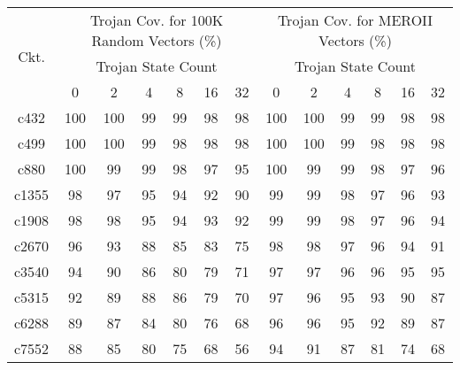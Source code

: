 




\begin{table}[h]
\begin{tabular}{|c|c|c|c|c|c|c|c|c|c|c|c|c|}
\hline
\multirow{3}{*}{Ckt.} & \multicolumn{6}{c|}{Trojan Cov. for 100K Random Vectors (\%)} & \multicolumn{6}{c|}{Trojan Cov. for MEROII Vectors (\%)} \\ \cline{2-13} 
                      & \multicolumn{6}{c|}{Trojan State Count}                       & \multicolumn{6}{c|}{Trojan State Count}                  \\ \cline{2-13} 
                      & 0         & 2         & 4       & 8       & 16      & 32      & 0        & 2        & 4       & 8      & 16     & 32     \\ \hline
c432                  & 100       & 100       & 99      & 99      & 98      & 98      & 100      & 100      & 99      & 99     & 98     & 98     \\ \hline
c499                  & 100       & 100       & 99      & 98      & 98      & 98      & 100      & 100      & 99      & 98     & 98     & 98     \\ \hline
c880                  & 100       & 99        & 99      & 98      & 97      & 95      & 100      & 99       & 99      & 98     & 97     & 96     \\ \hline
c1355                 & 98        & 97        & 95      & 94      & 92      & 90      & 99       & 99       & 98      & 97     & 96     & 93     \\ \hline
c1908                 & 98        & 98        & 95      & 94      & 93      & 92      & 99       & 99       & 98      & 97     & 96     & 94     \\ \hline
c2670                 & 96        & 93        & 88      & 85      & 83      & 75      & 98       & 98       & 97      & 96     & 94     & 91     \\ \hline
c3540                 & 94        & 90        & 86      & 80      & 79      & 71      & 97       & 97       & 96      & 96     & 95     & 95     \\ \hline
c5315                 & 92        & 89        & 88      & 86      & 79      & 70      & 97       & 96       & 95      & 93     & 90     & 87     \\ \hline
c6288                 & 89        & 87        & 84      & 80      & 76      & 68      & 96       & 96       & 95      & 92     & 89     & 87     \\ \hline
c7552                 & 88        & 85        & 80      & 75      & 68      & 56      & 94       & 91       & 87      & 81     & 74     & 68     \\ \hline
\end{tabular}
\end{table}
